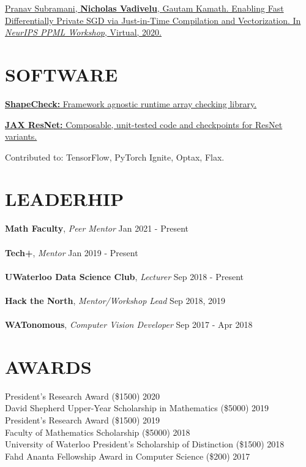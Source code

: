 \documentclass[line,margin]{res}
\newcommand{\experience}[3]{\textbf{#1}, \textit{#2} \hfill #3 \\ \vspace{-4mm}}
\newcommand{\paper}[6]{\href{#6}{#1. #2. In \textit{#3}, #4, #5.}}
\newcommand{\software}[3]{\href{#3}{\textbf{#1: } #2.}\vspace{-2mm}}
\newcommand{\award}[2]{#1 \hfill #2}
\begin{document}
\begin{resume}
    \paper
    {Pranav Subramani, \textbf{Nicholas Vadivelu}, Gautam Kamath}
    {Enabling Fast Differentially Private SGD via Just-in-Time Compilation and Vectorization}
    {\textit{NeurIPS PPML Workshop}}{Virtual}{2020}
    {https://arxiv.org/abs/2010.09063}

\section{SOFTWARE}
    \software{ShapeCheck}{Framework agnostic runtime array checking library}
    {https://github.com/n2cholas/jax-resnet}

    \software
    {JAX ResNet}{Composable, unit-tested code and checkpoints for ResNet variants}
    {https://pypi.org/project/shapecheck/}

    Contributed to: TensorFlow, PyTorch Ignite, Optax, Flax.

\newpage

\section{LEADERHIP}
    \experience{Math Faculty}{Peer Mentor}{Jan 2021 - Present} \\
    \experience{Tech+}{Mentor}{Jan 2019 - Present} \\
    \experience{UWaterloo Data Science Club}{Lecturer}{Sep 2018 - Present} \\
    \experience{Hack the North}{Mentor/Workshop Lead}{Sep 2018, 2019} \\
    \experience{WATonomous}{Computer Vision Developer}{Sep 2017 - Apr 2018}

\section{AWARDS}
    \award{President's Research Award (\$1500)}{2020}\\
    \award{David Shepherd Upper-Year Scholarship in Mathematics (\$5000)}{2019}\\
    \award{President's Research Award (\$1500)}{2019}\\
    \award{Faculty of Mathematics Scholarship (\$5000)}{2018}\\
    \award{University of Waterloo President's Scholarship of Distinction (\$1500)}{2018}\\
    \award{Fahd Ananta Fellowship Award in Computer Science (\$200)}{2017}


\end{resume}
\end{document}
